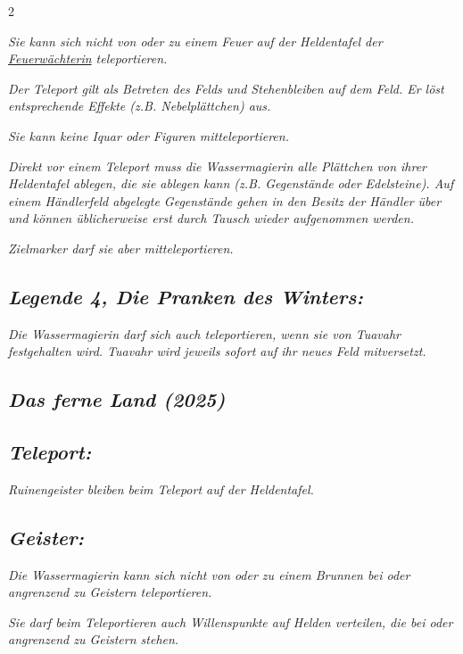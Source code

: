 \documentclass[10pt, a4paper, oneside]{book}
\newcommand{\fan}[1]{\textit{#1}}
\begin{document}
\begin{multicols*}{2}
\begin{bgcolor}
\fan{Sie kann sich nicht von oder zu einem Feuer auf der Heldentafel der \hyperref[Feuerwächterin]{Feuerwächterin} teleportieren.}


\fan{Der Teleport gilt als Betreten des Felds und Stehenbleiben auf dem Feld. Er löst entsprechende Effekte (z.B. Nebelplättchen) aus.}

\fan{Sie kann keine Iquar oder Figuren mitteleportieren.}

\fan{Direkt vor einem Teleport muss die Wassermagierin alle Plättchen von ihrer Heldentafel ablegen, die sie ablegen kann (z.B. Gegenstände oder Edelsteine). Auf einem Händlerfeld abgelegte Gegenstände gehen in den Besitz der Händler über und können üblicherweise erst durch Tausch wieder aufgenommen werden.}

\fan{Zielmarker darf sie aber mitteleportieren.}





\subsection{\fan{Legende 4, Die Pranken des Winters:}}

\fan{Die Wassermagierin darf sich auch teleportieren, wenn sie von Tuavahr festgehalten wird. Tuavahr wird jeweils sofort auf ihr neues Feld mitversetzt.}




\end{bgcolor}



\columnbreak


\begin{bgcolor}
\section{\fan{Das ferne Land (2025)}}


\subsection{\fan{Teleport:}}

\fan{Ruinengeister bleiben beim Teleport auf der Heldentafel.}


\subsection{\fan{Geister:}}

\fan{Die Wassermagierin kann sich nicht von oder zu einem Brunnen bei oder angrenzend zu Geistern teleportieren.}

\fan{Sie darf beim Teleportieren auch Willenspunkte auf Helden verteilen, die bei oder angrenzend zu Geistern stehen.}

\end{bgcolor}





\end{multicols*}
\end{document}
